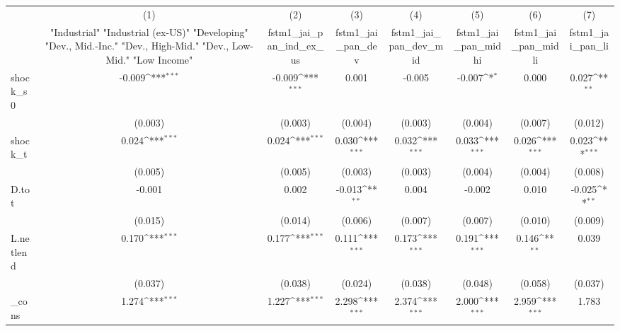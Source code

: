 {
\def\sym#1{\ifmmode^{#1}\else\(^{#1}\)\fi}
\begin{tabular}{l*{7}{c}}
\toprule
            &\multicolumn{1}{c}{(1)}&\multicolumn{1}{c}{(2)}&\multicolumn{1}{c}{(3)}&\multicolumn{1}{c}{(4)}&\multicolumn{1}{c}{(5)}&\multicolumn{1}{c}{(6)}&\multicolumn{1}{c}{(7)}\\
            &\multicolumn{1}{c}{ "Industrial" "Industrial (ex-US)" "Developing" "Dev., Mid.-Inc." "Dev., High-Mid."  "Dev., Low-Mid." "Low Income" }&\multicolumn{1}{c}{fstm1\_jai\_pan\_ind\_ex\_us}&\multicolumn{1}{c}{fstm1\_jai\_pan\_dev}&\multicolumn{1}{c}{fstm1\_jai\_pan\_dev\_mid}&\multicolumn{1}{c}{fstm1\_jai\_pan\_midhi}&\multicolumn{1}{c}{fstm1\_jai\_pan\_midli}&\multicolumn{1}{c}{fstm1\_jai\_pan\_li}\\
\midrule
shock\_s0    &      -0.009\sym{***}&      -0.009\sym{***}&       0.001         &      -0.005         &      -0.007\sym{*}  &       0.000         &       0.027\sym{**} \\
            &     (0.003)         &     (0.003)         &     (0.004)         &     (0.003)         &     (0.004)         &     (0.007)         &     (0.012)         \\
\addlinespace
shock\_t     &       0.024\sym{***}&       0.024\sym{***}&       0.030\sym{***}&       0.032\sym{***}&       0.033\sym{***}&       0.026\sym{***}&       0.023\sym{***}\\
            &     (0.005)         &     (0.005)         &     (0.003)         &     (0.003)         &     (0.004)         &     (0.004)         &     (0.008)         \\
\addlinespace
D.tot       &      -0.001         &       0.002         &      -0.013\sym{**} &       0.004         &      -0.002         &       0.010         &      -0.025\sym{**} \\
            &     (0.015)         &     (0.014)         &     (0.006)         &     (0.007)         &     (0.007)         &     (0.010)         &     (0.009)         \\
\addlinespace
L.netlend   &       0.170\sym{***}&       0.177\sym{***}&       0.111\sym{***}&       0.173\sym{***}&       0.191\sym{***}&       0.146\sym{**} &       0.039         \\
            &     (0.037)         &     (0.038)         &     (0.024)         &     (0.038)         &     (0.048)         &     (0.058)         &     (0.037)         \\
\addlinespace
\_cons      &       1.274\sym{***}&       1.227\sym{***}&       2.298\sym{***}&       2.374\sym{***}&       2.000\sym{***}&       2.959\sym{***}&       1.783         \\

\end{tabular}}
